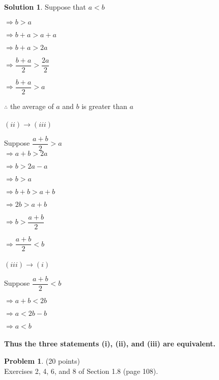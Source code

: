 \documentclass{article}
\theoremstyle{definition}
\newtheorem{problem}{Problem}
\newtheorem*{solution}{Solution}
\begin{document}
\begin{solution}
Suppose that $a < b$


$\Rightarrow b>a$


$\Rightarrow b + a > a + a$


$\Rightarrow b + a > 2a$


$\Rightarrow \dfrac{b+a}{2} > \dfrac{2a}{2}$


$\Rightarrow \dfrac{b+a}{2} > a$


$\therefore$ the average of $a$ and $b$ is greater than $a$ \\ \ \\
$(ii) \rightarrow (iii)$


Suppose $\dfrac{a+b}{2} > a$\\


$\Rightarrow a + b > 2a$


$\Rightarrow b > 2a - a$


$\Rightarrow b > a$


$\Rightarrow b + b > a + b$


$\Rightarrow 2b > a + b$


$\Rightarrow b > \dfrac{a + b}{2}$


$\Rightarrow \dfrac{a + b}{2} < b$\\ \ \\
$(iii) \rightarrow (i)$

Suppose $\dfrac{a+b}{2} < b$


$\Rightarrow a + b < 2b$


$\Rightarrow a < 2b - b$


$\Rightarrow a < b$\\ \ \\
\bf Thus the three statements (i), (ii), and (iii) are equivalent.





\end{solution}

\newpage

\begin{problem} (20 points)\\
Exercises 2, 4, 6, and 8 of Section 1.8 (page 108).
\end{problem}
\end{document}
